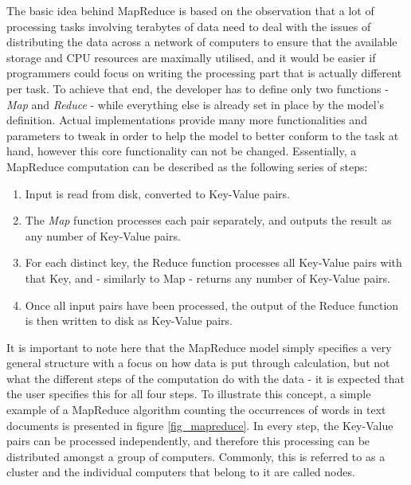 \documentclass [12pt,a4paper]{report}
\begin{document}
The basic idea behind MapReduce is based on the observation that a lot of processing tasks involving terabytes of data need to deal with the issues of distributing the data across a network of computers to ensure that the available storage and CPU resources are maximally utilised, and it would be easier if programmers could focus on writing the processing part that is actually different per task. To achieve that end, the developer has to define only two functions - \textit{Map} and \textit{Reduce} - while everything else is already set in place by the model's definition. Actual implementations provide many more functionalities and parameters to tweak in order to help the model to better conform to the task at hand, however this core functionality can not be changed. Essentially, a MapReduce computation can be described as the following series of steps:

\begin{enumerate}
\item Input is read from disk, converted to Key-Value pairs.
\item The \textit{Map} function processes each pair separately, and outputs the result as any number of Key-Value pairs.
\item For each distinct key, the Reduce function processes all Key-Value pairs with that Key, and - similarly to Map - returns any number of Key-Value pairs.
\item Once all input pairs have been processed, the output of the Reduce function is then written to disk as Key-Value pairs. 
\end{enumerate}

It is important to note here that the MapReduce model simply specifies a very general structure with a focus on how data is put through calculation, but not what the different steps of the computation do with the data - it is expected that the user specifies this for all four steps. To illustrate this concept, a simple example of a MapReduce algorithm counting the occurrences of words in text documents is presented in figure \ref{fig_mapreduce}. In every step, the Key-Value pairs can be processed independently, and therefore this processing can be distributed amongst a group of computers. Commonly, this is referred to as a cluster and the individual computers that belong to it are called nodes.
\end{document}
